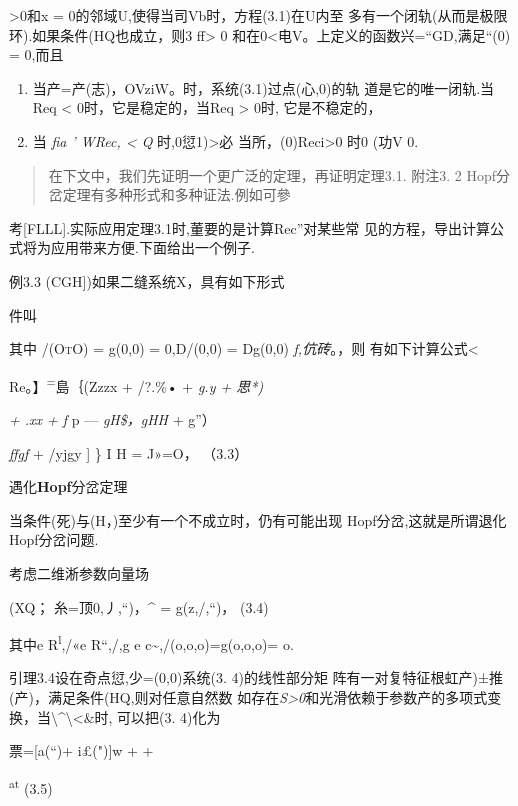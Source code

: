 \documentclass{article}
\begin{document}
\textgreater{}0和x = 0的邻域U,使得当\textbar{}司Vb时，方程(3.1)在U内至
多有一个闭轨(从而是极限环).如果条件(HQ也成立，则3 ff\textgreater{} 0
和在0\textless{}电V。上定义的函数兴=``GD,满足``(0) = 0,而且

\begin{enumerate}
\def\labelenumi{(\arabic{enumi})}
\item
  当产=产(志)，OVziW。时，系统(3.1)过点(心,0)的轨 道是它的唯一闭轨.当Req
  \textless{} 0时，它是稳定的，当Req \textgreater{} 0时, 它是不稳定的，
\item
  当 \emph{fia ' WRec, \textless{} Q} 时,0愆1)\textgreater{}必
  当所，(0)Reci\textgreater{}0 时0 (功V 0.
\end{enumerate}

\begin{quote}
在下文中，我们先证明一个更广泛的定理，再证明定理3.1. 附注3. 2
Hopf分岔定理有多种形式和多种证法.例如可參
\end{quote}

考{[}FLLL{]}.实际应用定理3.1时,董要的是计算Rec''对某些常
见的方程，导出计算公式将为应用带来方便.下面给出一个例子.

例3.3 (CGH{]})如果二缝系统X，具有如下形式

件叫

其中 \textsc{/(OtO)} = g(0,0) = 0,D/(0,0) = Dg(0,0) \emph{f,伉砖}。，则
有如下计算公式\textless{}

Re。】\textsuperscript{=}島｛(Zzzx + /?.\%• + \emph{g.y + 思*)}

\emph{+ .xx + f} p --- \emph{gH\$，gHH} + g''）

\emph{ffgf} + /yjgy {]} \} I H = J»=O， （3.3）

遇化\textbf{Hopf}分岔定理

当条件(死)与(H，)至少有一个不成立时，仍有可能出现
Hopf分岔,这就是所谓退化Hopf分岔问题.

考虑二维淅参数向量场

(XQ； 糸=顶0,丿,``)，\^{} = g(z,/,``)， (3.4)

其中e R\textsuperscript{l},/«e R``,/,g e
c\textasciitilde{},/(o,o,o)=g(o,o,o)= o.

引理3.4设在奇点愆,少=(0,0)系统(3. 4)的线性部分矩
阵有一对复特征根虹产)±推(产)，满足条件(HQ,则对任意自然数
如存在\emph{S\textgreater{}0}和光滑依赖于参数产的多项式变换，当\textbackslash{}\^{}\textbackslash{}\textless{}\&时,
可以把(3. 4)化为

票={[}a(``)+ i£("){]}w + +

\textsuperscript{at} (3.5)
\end{document}
